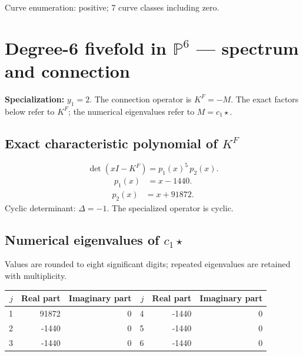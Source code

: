 \documentclass[10pt,a4paper]{article}
\begin{document}
Curve enumeration: positive; 7 curve classes including zero.
\clearpage\section*{Degree-6 fivefold in $\mathbb P^{6}$ --- spectrum and connection}
\textbf{Specialization:} $y_1=2$. The connection operator is $K^F=-M$. The exact factors below refer to $K^F$; the numerical eigenvalues refer to $M=c_1\star$.
\subsection*{Exact characteristic polynomial of $K^F$}
\[\det(xI-K^F)=p_{1}(x)^{5}\,p_{2}(x).\]
\[\begin{aligned}p_{1}(x)&=x - 1440.\end{aligned}\]
\[\begin{aligned}p_{2}(x)&=x + 91872.\end{aligned}\]
Cyclic determinant: $\Delta=-1$. The specialized operator is cyclic.
\subsection*{Numerical eigenvalues of $c_1\star$}
Values are rounded to eight significant digits; repeated eigenvalues are retained with multiplicity.
\begin{center}\small\begin{tabular}{rrr@{\qquad}rrr}\toprule $j$ & Real part & Imaginary part & $j$ & Real part & Imaginary part\\\midrule
1 & 91872 & 0 & 4 & -1440 & 0\\
2 & -1440 & 0 & 5 & -1440 & 0\\
3 & -1440 & 0 & 6 & -1440 & 0\\
\bottomrule\end{tabular}\end{center}
\end{document}
